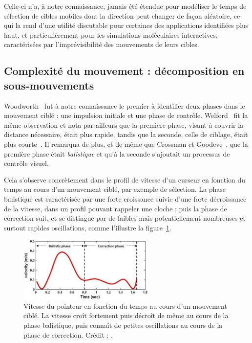 	Celle-ci n'a, à notre connaissance, jamais été étendue pour modéliser le temps de sélection de cibles mobiles dont la direction peut changer de façon aléatoire, ce qui la rend d'une utilité discutable pour certaines des applications identifiées plus haut, et particulièrement pour les simulations moléculaires interactives, caractérisées par l'imprévisibilité des mouvements de leurs cibles.
	
	\subsection{Complexité du mouvement : décomposition en sous-mouvements}
	Woodworth~\cite{woodworth1899accuracy} fut à notre connaissance le premier à identifier deux phases dans le mouvement ciblé : une impulsion initiale et une phase de contrôle. Welford~\cite{welford1968fundamentals} fit la même observation et nota par ailleurs que la première phase, visant à couvrir la distance nécessaire, était plus rapide, tandis que la seconde, celle de ciblage, était plus courte~\cite{mackenzie1987three}. Il remarqua de plus, et de même que Crossman et Goodeve~\cite{crossman1983feedback}, que la première phase était \emph{balistique} et qu'à la seconde s'ajoutait un processus de contrôle visuel.
	
	Cela s'observe concrètement dans le profil de vitesse d'un curseur en fonction du temps au cours d'un mouvement ciblé, par exemple de sélection. La phase balistique est caractérisée par une forte croissance suivie d'une forte décroissance de la vitesse, dans un profil pouvant rappeler une cloche ; puis la phase de correction suit, et se distingue par de faibles mais potentiellement nombreuses et surtout rapides oscillations, comme l'illustre la figure~\ref{fig:ballistic}.
	
	\begin{figure}[!htbp]
		\centering
		\includegraphics[width=0.60\textwidth]{figures/ch2/ballistic}
		\caption[Profil de vitesse -- phases balistique et de correction]{Vitesse du pointeur en fonction du temps au cours d'un mouvement ciblé. La vitesse croît fortement puis décroît de même au cours de la phase balistique, puis connaît de petites oscillations au cours de la phase de correction. Crédit : \cite{liu2009designing}.}
		\label{fig:ballistic}
	\end{figure}
	
